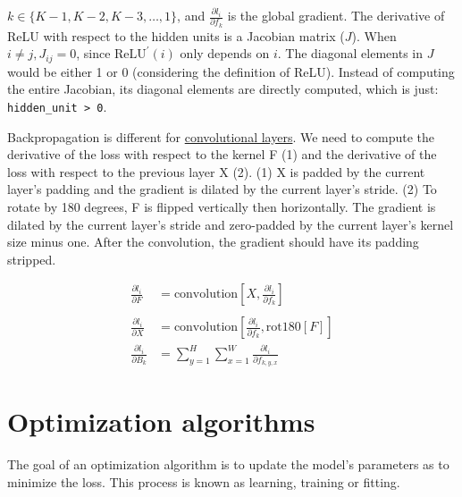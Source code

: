 \documentclass{article}
\begin{document}
$k \in \{K - 1, K - 2, K - 3, \dots, 1\}$, and $\frac{\partial l_i}{\partial f_k}$ is the global gradient. The derivative of ReLU with respect to the hidden units is a Jacobian matrix ($J$). When $i \neq j, J_{ij} = 0$, since $\text{ReLU}^{\prime}(i)$ only depends on $i$. The diagonal elements in $J$ would be either 1 or 0 (considering the definition of ReLU). Instead of computing the entire Jacobian, its diagonal elements are directly computed, which is just: \texttt{hidden\_unit > 0}.

Backpropagation is different for \href{https://deeplearning.cs.cmu.edu/F21/document/recitation/Recitation5/CNN_Backprop_Recitation_5_F21.pdf}{convolutional layers}. We need to compute the derivative of the loss with respect to the kernel F (1) and the derivative of the loss with respect to the previous layer X (2).
(1) X is padded by the current layer's padding and the gradient is dilated by the current layer's stride.
(2) To rotate by 180 degrees, F is flipped vertically then horizontally. The gradient is dilated by the current layer's stride and zero-padded by the current layer's kernel size minus one. After the convolution, the gradient should have its padding stripped.

\begin{align*}
\frac{\partial l_i}{\partial F} &= \text{convolution}\left[X, \frac{\partial l_i}{\partial f_k}\right] \tag{1} \\\\
\frac{\partial l_i}{\partial X} &= \text{convolution}\left[\frac{\partial l_i}{\partial f_k}, \text{rot180}[F]\right] \tag{2}\\
\frac{\partial l_i}{\partial B_k} &= \sum_{y=1}^{H} \sum_{x=1}^{W} \frac{\partial l_i}{\partial f_{k,y,x}} \tag{3}
\end{align*}

\section{Optimization algorithms}
The goal of an optimization algorithm is to update the model's parameters as to minimize the loss. This process is known as learning, training or fitting.
\end{document}
